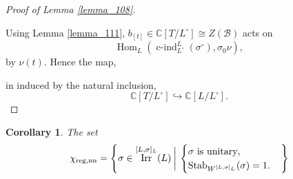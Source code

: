 \documentclass[8pt]{article}
\newtheorem{corollary}{Corollary} [section]
\DeclareMathOperator{\Stab}{Stab}
\DeclareMathOperator{\cind}{c-ind}
\DeclareMathOperator{\Hom}{Hom}
\DeclareMathOperator{\Irr}{Irr}
\DeclareMathOperator{\nr}{nr}
\DeclareMathOperator{\nn}{nn}
\DeclareMathOperator{\reg}{reg}
\DeclareMathOperator{\Max}{Max}
\newcommand{\C}[0]{\mathbb{C}}
\newcommand{\cB}{\mathcal{B}}
\begin{document}
\begin{proof}[Proof of Lemma \ref{lemma_108}]
  \begin{center}
  \end{center}
  Using Lemma \ref{lemma_111}, $b_{[t]}\in\C[T/L^\circ]\cong Z(\cB)$ acts on 
  \begin{equation*}
    \Hom_L(\cind_{L^\circ}^L(\sigma^\circ),\sigma_0\nu),
  \end{equation*}
  by $\nu(t)$. Hence the map,
  \begin{center}
  \end{center}
  in induced by the natural inclusion,
  \begin{equation*}
    \C[T/L^\circ]\hookrightarrow\C[L/L^\circ].
  \end{equation*}
\end{proof}

\begin{corollary}
  \label{corollary_111}
  The set 
  \begin{equation*}
    \chi_{\reg,\nn}=\left\{\sigma\in\Irr^{[L,\sigma]_L}(L)\:\bigg{|}\: \begin{cases}
      \sigma\text{ is unitary},\\
      \Stab_{W^{[L,\sigma]_L}}(\sigma)=1.
    \end{cases}
    \right\}
  \end{equation*}
\end{corollary}
\end{document}
